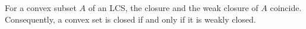 For a convex subset $A$ of an LCS, the closure and the weak closure of $A$ coincide. Consequently, a convex set is closed if and only if it is weakly closed.